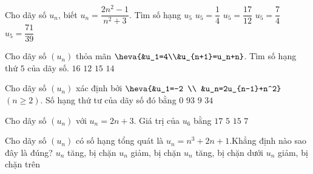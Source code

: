 \begin{ex}%
	Cho dãy số $u_n$, biết $u_n=\dfrac{2n^2-1}{n^2+3}$.  Tìm số hạng $u_5$
	\choice 
		{$u_5=\dfrac{1}{4}$} 
		 {$u_5=\dfrac{17}{12}$}
		 {\True $u_5=\dfrac{7}{4}$}
		 {$u_5=\dfrac{71}{39}$}
\end{ex}

\begin{ex}%
	Cho dãy số $(u_n)$ thỏa mãn $\heva{&u_1=4\\&u_{n+1}=u_n+n}$. Tìm  số hạng thứ $5$ của dãy số.
	 \choice
		{$16$} 
		{$12$} 
		{$15$} 
		 {\True$14$}
\end{ex}

\begin{ex}%
	Cho dãy số $(u_n)$  xác định bởi
	$\heva{&u_1=-2  \\
	&u_n=2u_{n-1}+n^2}$ 
	$(n \geq 2)$. Số hạng thứ tư của  dãy số đó bằng
	\choice 
		 {$0$}
		{$93$} 
		{$9$} 
		{\True  $34$}
\end{ex}

\begin{ex}%
	Cho dãy số $(u_n)$ với $u_n=2n+3$. Giá trị của  $u_6$ bằng
	\choice 
		{$17$} 
		 {$5$}
		{\True  $15$}
		 {$7$}
\end{ex}

\begin{ex}%
	Cho dãy số $(u_n)$ có số hạng tổng quát là $u_n =  n^3 + 2n + 1$.Khẳng định nào sao đây là đúng?
	\choice 
		{$u_n$ tăng,  bị chặn}
		{$u_n$ giảm, bị chặn} 
		{\True $u_n$ tăng, bị chặn  dưới}
		{$u_n$ giảm,  bị chặn trên}
\end{ex}

